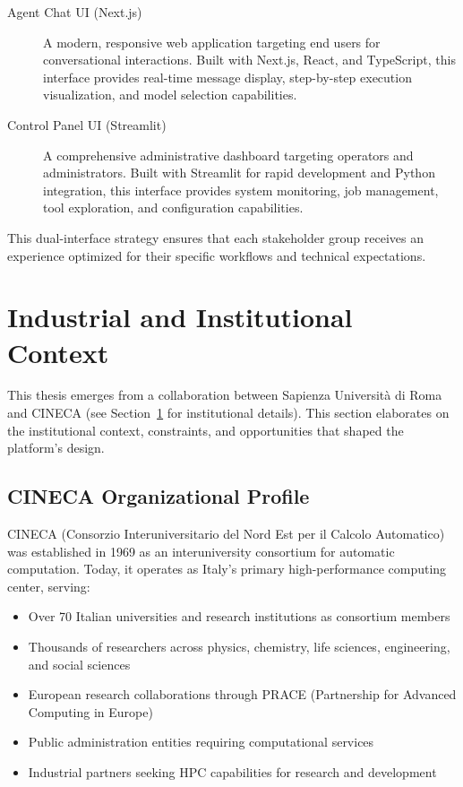 \documentclass[a4paper,twoside]{sapthesis}
\begin{document}
\begin{description}
    \item[Agent Chat UI (Next.js)] A modern, responsive web application targeting end users for conversational interactions. Built with Next.js, React, and TypeScript, this interface provides real-time message display, step-by-step execution visualization, and model selection capabilities.
    
    \item[Control Panel UI (Streamlit)] A comprehensive administrative dashboard targeting operators and administrators. Built with Streamlit for rapid development and Python integration, this interface provides system monitoring, job management, tool exploration, and configuration capabilities.
\end{description}

This dual-interface strategy ensures that each stakeholder group receives an experience optimized for their specific workflows and technical expectations.

\section{Industrial and Institutional Context}
\label{sec:industrial-context}

This thesis emerges from a collaboration between Sapienza Università di Roma and CINECA (see Section~\ref{sec:industrial-context} for institutional details). This section elaborates on the institutional context, constraints, and opportunities that shaped the platform's design.

\subsection{CINECA Organizational Profile}

CINECA (Consorzio Interuniversitario del Nord Est per il Calcolo Automatico) was established in 1969 as an interuniversity consortium for automatic computation. Today, it operates as Italy's primary high-performance computing center, serving:

\begin{itemize}
    \item Over 70 Italian universities and research institutions as consortium members
    \item Thousands of researchers across physics, chemistry, life sciences, engineering, and social sciences
    \item European research collaborations through PRACE (Partnership for Advanced Computing in Europe)
    \item Public administration entities requiring computational services
    \item Industrial partners seeking HPC capabilities for research and development
\end{itemize}
\end{document}
